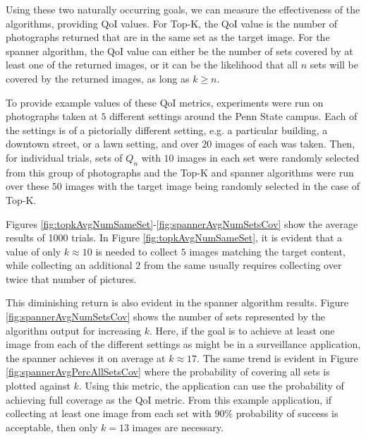Using these two naturally occurring goals, we can measure the effectiveness of the algorithms, providing QoI values.  For Top-K, the QoI value is the number of photographs returned that are in the same set as the target image.  For the spanner algorithm, the QoI value can either be the number of sets covered by at least one of the returned images, or it can be the likelihood that all $n$ sets will be covered by the returned images, as long as $k \geq n$.

To provide example values of these QoI metrics, experiments were run on photographs taken at $5$ different settings around the Penn State campus.  Each of the settings is of a pictorially different setting, e.g. a particular building, a downtown street, or a lawn setting, and over $20$ images of each was taken.  Then, for individual trials, sets of $Q_n$ with $10$ images in each set were randomly selected from this group of photographs and the Top-K and spanner algorithms were run over these $50$ images with the target image being randomly selected in the case of Top-K.

Figures \ref{fig:topkAvgNumSameSet}-\ref{fig:spannerAvgNumSetsCov} show the average results of 1000 trials.  In Figure \ref{fig:topkAvgNumSameSet}, it is evident that a value of only $k \approx 10$ is needed to collect $5$ images matching the target content, while collecting an additional $2$ from the same usually requires collecting over twice that number of pictures.  

This diminishing return is also evident in the spanner algorithm results.  Figure \ref{fig:spannerAvgNumSetsCov} shows the number of sets represented by the algorithm output for increasing $k$.  Here, if the goal is to achieve at least one image from each of the different settings as might be in a surveillance application, the spanner achieves it on average at $k \approx 17$.  The same trend is evident in Figure \ref{fig:spannerAvgPercAllSetsCov} where the probability of covering all sets is plotted against $k$.  Using this metric, the application can use the probability of achieving full coverage as the QoI metric.  From this example application, if collecting at least one image from each set with $90\%$ probability of success is acceptable, then only $k=13$ images are necessary.


